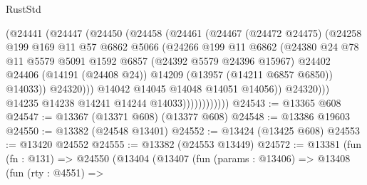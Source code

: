\begin{lexlean}{RustStd}
\begin{coremodule}
                              (@24441
                                (@24447
                                  (@24450
                                    (@24458
                                      (@24461
                                        (@24467
                                          (@24472 @24475)
                                          (@24258
                                            @199
                                            @169
                                            @11
                                            @57
                                            @6862
                                            @5066
                                            (@24266
                                              @199
                                              @11
                                              @6862
                                              (@24380
                                                @24
                                                @78
                                                @11
                                                @5579
                                                @5091
                                                @1592
                                                @6857
                                                (@24392 @5579 @24396 @15967)
                                                @24402
                                                @24406
                                                (@14191 (@24408 @24))
                                                @14209
                                                (@13957 (@14211 @6857 @6850))
                                                @14033))
                                            @24320)))
                                      @14042
                                      @14045
                                      @14048
                                      @14051
                                      @14056))
                                  @24320)))
                            @14235
                            @14238
                            @14241
                            @14244
                            @14033))))))))))))
@24543 := @13365 @608
@24547 := @13367 (@13371 @608) (@13377 @608)
@24548 := @13386 @19603
@24550 := @13382 (@24548 @13401)
@24552 := @13424 (@13425 @608)
@24553 := @13420 @24552
@24555 := @13382 (@24553 @13449)
@24572 := @13381
    (fun (fn : @131) =>
    @24550
      (@13404
        (@13407
          (fun (params : @13406) =>
          @13408
            (fun (rty : @4551) =>

\end{coremodule}
\end{lexlean}
